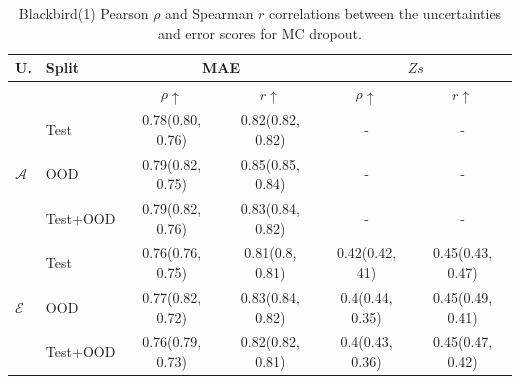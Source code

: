 \begin{table}[ht]
\centering
    \begin{tabular}{l l c c c c}  
        \toprule
        U. & Split & \multicolumn{2}{c}{MAE} & \multicolumn{2}{c}{$Zs$}\\
        \midrule
        & & $\rho \uparrow$ & $r \uparrow$ & $\rho \uparrow$ & $r \uparrow$ \\
        \multirow{3}{*}{$\mathcal{A}$} 
            & Test     & 0.78(0.80, 0.76) & 0.82(0.82, 0.82) & - & - \\  
            & OOD      & 0.79(0.82, 0.75) & 0.85(0.85, 0.84) & - & - \\  
            & Test+OOD & 0.79(0.82, 0.76) & 0.83(0.84, 0.82) & - & - \\ 

        \midrule
        \multirow{3}{*}{$\mathcal{E}$} 
            & Test     & 0.76(0.76, 0.75) & 0.81(0.8, 0.81) &  0.42(0.42, 41)  & 0.45(0.43, 0.47) \\  
            & OOD      & 0.77(0.82, 0.72) & 0.83(0.84, 0.82) &  0.4(0.44, 0.35) & 0.45(0.49, 0.41) \\
            & Test+OOD & 0.76(0.79, 0.73) & 0.82(0.82, 0.81) &  0.4(0.43, 0.36) & 0.45(0.47, 0.42) \\ 

        \toprule
    \end{tabular}
    \caption[Blackbird(1) error-uncertainty correlations for MC dropout]{Blackbird(1) Pearson $\rho$ and Spearman $r$ correlations between the uncertainties and error scores for MC dropout.}
    \label{tbl:bb1_dropout_corr}
\end{table}

